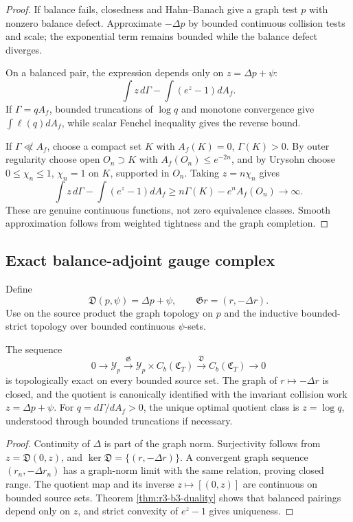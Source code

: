 \begin{proof}
If balance fails, closedness and Hahn--Banach give a graph test \(p\) with
nonzero balance defect.  Approximate \(-\Delta p\) by bounded continuous
collision tests and scale; the exponential term remains bounded while the
balance defect diverges.

On a balanced pair, the expression depends only on
\(z=\Delta p+\psi\):
\[
 \int z\,d\Gamma-\int(e^z-1)dA_f.
\]
If \(\Gamma=qA_f\), bounded truncations of \(\log q\) and monotone convergence
give \(\int\ell(q)dA_f\), while scalar Fenchel inequality gives the reverse
bound.

If \(\Gamma\not\ll A_f\), choose a compact set \(K\) with
\(A_f(K)=0\), \(\Gamma(K)>0\).  By outer regularity choose open
\(O_n\supset K\) with \(A_f(O_n)\le e^{-2n}\), and by Urysohn choose
\(0\le\chi_n\le1\), \(\chi_n=1\) on \(K\), supported in \(O_n\).  Taking
\(z=n\chi_n\) gives
\[
 \int z\,d\Gamma-\int(e^z-1)dA_f
 \ge n\Gamma(K)-e^nA_f(O_n)\to\infty.
\]
These are genuine continuous functions, not zero equivalence classes.  Smooth
approximation follows from weighted tightness and the graph completion.
\end{proof}

\subsection{Exact balance-adjoint gauge complex}

Define
\[
 \mathfrak D(p,\psi)=\Delta p+\psi,
 \qquad
 \mathfrak G r=(r,-\Delta r).
\]
Use on the source product the graph topology on \(p\) and the inductive
bounded-strict topology over bounded continuous \(\psi\)-sets.

\begin{theorem}
\label{thm:r3-b3-gauge}
The sequence
\[
 0\longrightarrow\mathcal Y_p
 \xrightarrow{\mathfrak G}
 \mathcal Y_p\times C_b(\mathfrak C_T)
 \xrightarrow{\mathfrak D}
 C_b(\mathfrak C_T)
 \longrightarrow0
\]
is topologically exact on every bounded source set.  The graph of
\(r\mapsto-\Delta r\) is closed, and the quotient is canonically identified
with the invariant collision work \(z=\Delta p+\psi\).  For
\(q=d\Gamma/dA_f>0\), the unique optimal quotient class is
\(z=\log q\), understood through bounded truncations if necessary.
\end{theorem}

\begin{proof}
Continuity of \(\Delta\) is part of the graph norm.  Surjectivity follows
from \(z=\mathfrak D(0,z)\), and
\(\ker\mathfrak D=\{(r,-\Delta r)\}\).  A convergent graph sequence
\((r_n,-\Delta r_n)\) has a graph-norm limit with the same relation, proving
closed range.  The quotient map and its inverse
\(z\mapsto[(0,z)]\) are continuous on bounded source sets.  Theorem
\ref{thm:r3-b3-duality} shows that balanced pairings depend only on \(z\), and
strict convexity of \(e^z-1\) gives uniqueness.
\end{proof}

